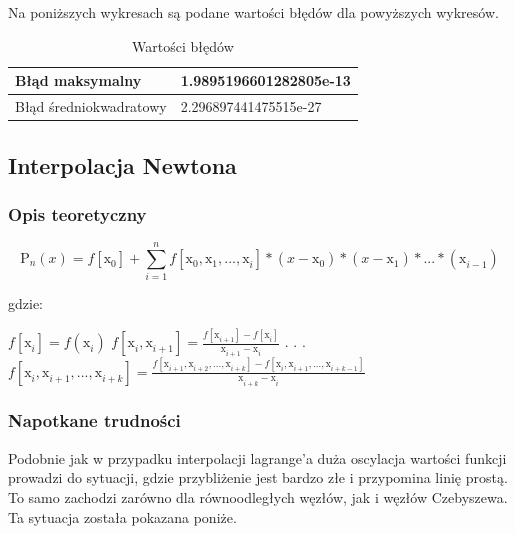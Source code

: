 \documentclass{article}
\begin{document}
Na poniższych wykresach są podane wartości błędów dla powyższych wykresów.

\begin{table}[!ht]
    \centering
    \begin{tabular}{|l|l|}
    \hline
        Błąd maksymalny & 1.9895196601282805e-13 \\ \hline
        Błąd średniokwadratowy & 2.296897441475515e-27 \\ \hline
    \end{tabular}
    \caption{Wartości błędów}
\end{table}

\newpage

\subsection{Interpolacja Newtona}

\subsubsection{Opis teoretyczny}

\[ \mathrm{P}_{n}^{}(x) = f[\mathrm{x}_{0}^{}] + \sum_{i = 1}^{n}f[\mathrm{x}_{0}^{}, \mathrm{x}_{1}^{}, ..., \mathrm{x}_{i}^{}]*(x - \mathrm{x}_{0}^{})*(x - \mathrm{x}_{1}^{})*...*(\mathrm{x}_{i - 1}^{})\]

\noindent
gdzie:
\bigbreak

\( f[\mathrm{x}_{i}^{}] = f(\mathrm{x}_{i}^{}) \) \newline \indent
\( f[\mathrm{x}_{i}^{}, \mathrm{x}_{i+1}^{}] = \frac{f[\mathrm{x}_{i+1}^{}]-f[\mathrm{x}_{i}^{}]}{\mathrm{x}_{i+1}^{}-\mathrm{x}_{i}^{}} \) \newline \indent
\( . \) \newline \indent
\( . \) \newline \indent
\( . \) \newline \indent
\( f[\mathrm{x}_{i}^{}, \mathrm{x}_{i+1}^{}, ..., \mathrm{x}_{i + k}^{}] =
\frac{f[\mathrm{x}_{i+1}^{}, \mathrm{x}_{i+2}^{}, ..., \mathrm{x}_{i + k}^{}] - f[\mathrm{x}_{i}^{}, \mathrm{x}_{i+1}^{}, ..., \mathrm{x}_{i + k -1}^{}]}{\mathrm{x}_{i+k}^{} - \mathrm{x}_{i}^{}} \) \newline

\subsubsection{Napotkane trudności}

Podobnie jak w przypadku interpolacji lagrange'a duża oscylacja wartości funkcji prowadzi do sytuacji, gdzie przybliżenie jest bardzo złe i przypomina linię prostą. To samo zachodzi zarówno dla równoodległych węzłów, jak i węzłów Czebyszewa. Ta sytuacja została pokazana poniże.
\end{document}
